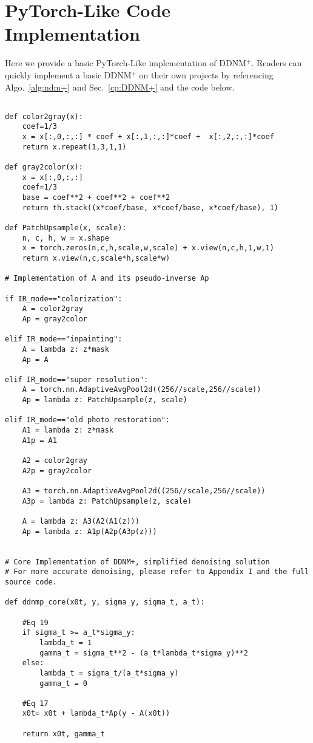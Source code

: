 \documentclass{article} \usepackage{iclr2023_conference,times}
\begin{document}
\section{PyTorch-Like Code Implementation}
\label{pseudo code}

Here we provide a basic PyTorch-Like implementation of DDNM$^+$. Readers can quickly implement a basic DDNM$^+$ on their own projects by referencing Algo.~\ref{alg:ndm+} and Sec.~\ref{cp:DDNM+} and the code below.


\begin{lstlisting}

def color2gray(x):
    coef=1/3
    x = x[:,0,:,:] * coef + x[:,1,:,:]*coef +  x[:,2,:,:]*coef
    return x.repeat(1,3,1,1)

def gray2color(x):
    x = x[:,0,:,:]
    coef=1/3
    base = coef**2 + coef**2 + coef**2
    return th.stack((x*coef/base, x*coef/base, x*coef/base), 1)      
    
def PatchUpsample(x, scale):
    n, c, h, w = x.shape
    x = torch.zeros(n,c,h,scale,w,scale) + x.view(n,c,h,1,w,1)
    return x.view(n,c,scale*h,scale*w)

# Implementation of A and its pseudo-inverse Ap    
    
if IR_mode=="colorization":
    A = color2gray
    Ap = gray2color
    
elif IR_mode=="inpainting":
    A = lambda z: z*mask
    Ap = A
      
elif IR_mode=="super resolution":
    A = torch.nn.AdaptiveAvgPool2d((256//scale,256//scale))
    Ap = lambda z: PatchUpsample(z, scale)

elif IR_mode=="old photo restoration":
    A1 = lambda z: z*mask
    A1p = A1
    
    A2 = color2gray
    A2p = gray2color
    
    A3 = torch.nn.AdaptiveAvgPool2d((256//scale,256//scale))
    A3p = lambda z: PatchUpsample(z, scale)
    
    A = lambda z: A3(A2(A1(z)))
    Ap = lambda z: A1p(A2p(A3p(z)))
    

# Core Implementation of DDNM+, simplified denoising solution
# For more accurate denoising, please refer to Appendix I and the full source code.

def ddnmp_core(x0t, y, sigma_y, sigma_t, a_t):

    #Eq 19
    if sigma_t >= a_t*sigma_y: 
        lambda_t = 1
        gamma_t = sigma_t**2 - (a_t*lambda_t*sigma_y)**2
    else:
        lambda_t = sigma_t/(a_t*sigma_y)
        gamma_t = 0
        
    #Eq 17    
    x0t= x0t + lambda_t*Ap(y - A(x0t))
    
    return x0t, gamma_t
    
\end{lstlisting}
\end{document}
